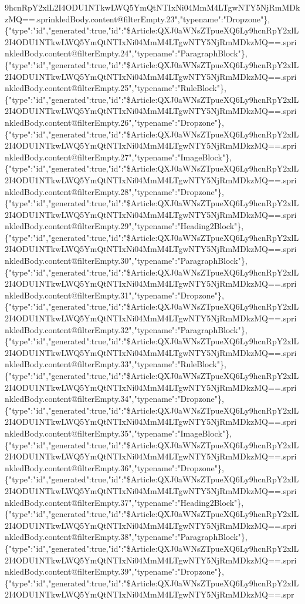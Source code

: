 9hcnRpY2xlL2I4ODU1NTkwLWQ5YmQtNTIxNi04MmM4LTgwNTY5NjRmMDkzMQ==.sprinkledBody.content@filterEmpty.23","typename":"Dropzone"\},\{"type":"id","generated":true,"id":"\$Article:QXJ0aWNsZTpueXQ6Ly9hcnRpY2xlL2I4ODU1NTkwLWQ5YmQtNTIxNi04MmM4LTgwNTY5NjRmMDkzMQ==.sprinkledBody.content@filterEmpty.24","typename":"ParagraphBlock"\},\{"type":"id","generated":true,"id":"\$Article:QXJ0aWNsZTpueXQ6Ly9hcnRpY2xlL2I4ODU1NTkwLWQ5YmQtNTIxNi04MmM4LTgwNTY5NjRmMDkzMQ==.sprinkledBody.content@filterEmpty.25","typename":"RuleBlock"\},\{"type":"id","generated":true,"id":"\$Article:QXJ0aWNsZTpueXQ6Ly9hcnRpY2xlL2I4ODU1NTkwLWQ5YmQtNTIxNi04MmM4LTgwNTY5NjRmMDkzMQ==.sprinkledBody.content@filterEmpty.26","typename":"Dropzone"\},\{"type":"id","generated":true,"id":"\$Article:QXJ0aWNsZTpueXQ6Ly9hcnRpY2xlL2I4ODU1NTkwLWQ5YmQtNTIxNi04MmM4LTgwNTY5NjRmMDkzMQ==.sprinkledBody.content@filterEmpty.27","typename":"ImageBlock"\},\{"type":"id","generated":true,"id":"\$Article:QXJ0aWNsZTpueXQ6Ly9hcnRpY2xlL2I4ODU1NTkwLWQ5YmQtNTIxNi04MmM4LTgwNTY5NjRmMDkzMQ==.sprinkledBody.content@filterEmpty.28","typename":"Dropzone"\},\{"type":"id","generated":true,"id":"\$Article:QXJ0aWNsZTpueXQ6Ly9hcnRpY2xlL2I4ODU1NTkwLWQ5YmQtNTIxNi04MmM4LTgwNTY5NjRmMDkzMQ==.sprinkledBody.content@filterEmpty.29","typename":"Heading2Block"\},\{"type":"id","generated":true,"id":"\$Article:QXJ0aWNsZTpueXQ6Ly9hcnRpY2xlL2I4ODU1NTkwLWQ5YmQtNTIxNi04MmM4LTgwNTY5NjRmMDkzMQ==.sprinkledBody.content@filterEmpty.30","typename":"ParagraphBlock"\},\{"type":"id","generated":true,"id":"\$Article:QXJ0aWNsZTpueXQ6Ly9hcnRpY2xlL2I4ODU1NTkwLWQ5YmQtNTIxNi04MmM4LTgwNTY5NjRmMDkzMQ==.sprinkledBody.content@filterEmpty.31","typename":"Dropzone"\},\{"type":"id","generated":true,"id":"\$Article:QXJ0aWNsZTpueXQ6Ly9hcnRpY2xlL2I4ODU1NTkwLWQ5YmQtNTIxNi04MmM4LTgwNTY5NjRmMDkzMQ==.sprinkledBody.content@filterEmpty.32","typename":"ParagraphBlock"\},\{"type":"id","generated":true,"id":"\$Article:QXJ0aWNsZTpueXQ6Ly9hcnRpY2xlL2I4ODU1NTkwLWQ5YmQtNTIxNi04MmM4LTgwNTY5NjRmMDkzMQ==.sprinkledBody.content@filterEmpty.33","typename":"RuleBlock"\},\{"type":"id","generated":true,"id":"\$Article:QXJ0aWNsZTpueXQ6Ly9hcnRpY2xlL2I4ODU1NTkwLWQ5YmQtNTIxNi04MmM4LTgwNTY5NjRmMDkzMQ==.sprinkledBody.content@filterEmpty.34","typename":"Dropzone"\},\{"type":"id","generated":true,"id":"\$Article:QXJ0aWNsZTpueXQ6Ly9hcnRpY2xlL2I4ODU1NTkwLWQ5YmQtNTIxNi04MmM4LTgwNTY5NjRmMDkzMQ==.sprinkledBody.content@filterEmpty.35","typename":"ImageBlock"\},\{"type":"id","generated":true,"id":"\$Article:QXJ0aWNsZTpueXQ6Ly9hcnRpY2xlL2I4ODU1NTkwLWQ5YmQtNTIxNi04MmM4LTgwNTY5NjRmMDkzMQ==.sprinkledBody.content@filterEmpty.36","typename":"Dropzone"\},\{"type":"id","generated":true,"id":"\$Article:QXJ0aWNsZTpueXQ6Ly9hcnRpY2xlL2I4ODU1NTkwLWQ5YmQtNTIxNi04MmM4LTgwNTY5NjRmMDkzMQ==.sprinkledBody.content@filterEmpty.37","typename":"Heading2Block"\},\{"type":"id","generated":true,"id":"\$Article:QXJ0aWNsZTpueXQ6Ly9hcnRpY2xlL2I4ODU1NTkwLWQ5YmQtNTIxNi04MmM4LTgwNTY5NjRmMDkzMQ==.sprinkledBody.content@filterEmpty.38","typename":"ParagraphBlock"\},\{"type":"id","generated":true,"id":"\$Article:QXJ0aWNsZTpueXQ6Ly9hcnRpY2xlL2I4ODU1NTkwLWQ5YmQtNTIxNi04MmM4LTgwNTY5NjRmMDkzMQ==.sprinkledBody.content@filterEmpty.39","typename":"Dropzone"\},\{"type":"id","generated":true,"id":"\$Article:QXJ0aWNsZTpueXQ6Ly9hcnRpY2xlL2I4ODU1NTkwLWQ5YmQtNTIxNi04MmM4LTgwNTY5NjRmMDkzMQ==.spr
